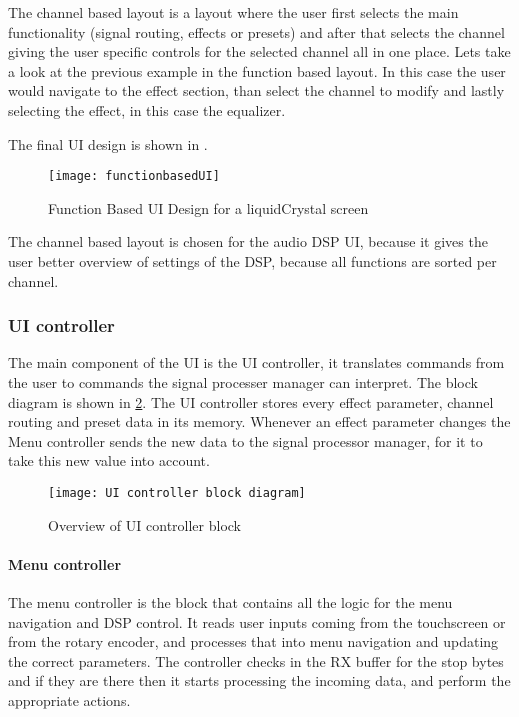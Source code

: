 The channel based layout is a layout where the user first selects the main functionality (signal routing, effects or presets) and after that selects the channel giving the user specific controls for the selected channel all in one place. Lets take a look at the previous example in the function based layout. In this case the user would navigate to the effect section, than select the channel to modify and lastly selecting the effect, in this case the equalizer.

The final UI design is shown in .

\begin{figure}[ht]
    \texttt{[image: functionbasedUI]}
    \caption{Function Based UI Design for a liquidCrystal screen}
    \label{fig:functionbasedUI}
\end{figure}

The channel based layout is chosen for the audio DSP UI, because it gives the user better overview of settings of the DSP, because all functions are sorted per channel.

\subsubsection{UI controller}
The main component of the UI is the UI controller, it translates commands from the user to commands the signal processer manager can interpret. The block diagram is shown in \ref{fig:UIcontroller-block-diagram}. The UI controller stores every effect parameter, channel routing and preset data in its memory. Whenever an effect parameter changes the Menu controller sends the new data to the signal processor manager, for it to take this new value into account. 

\begin{figure}[ht]
    \texttt{[image: UI controller block diagram]}
    \caption{Overview of UI controller block}
    \label{fig:UIcontroller-block-diagram}
\end{figure}

\paragraph{Menu controller}
The menu controller is the block that contains all the logic for the menu navigation and DSP control. It reads user inputs coming from the touchscreen or from the rotary encoder, and processes that into menu navigation and updating the correct parameters. The controller checks in the RX buffer for the stop bytes and if they are there then it starts processing the incoming data, and perform the appropriate actions.

